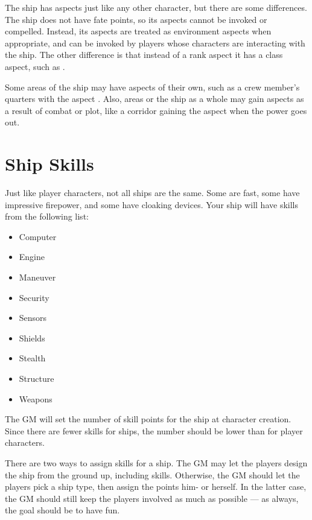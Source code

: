 \documentclass[12pt,titlepage,openany]{book}
\begin{document}
The ship has aspects just like any other character, but there are some
differences. The ship does not have fate points, so its aspects cannot be
invoked or compelled. Instead, its aspects are treated as environment aspects
when appropriate, and can be invoked by players whose characters are
interacting with the ship. The other difference is that instead of a rank
aspect it has a class aspect, such as .

Some areas of the ship may have aspects of their own, such as a crew member's
quarters with the aspect . Also, areas or the ship
as a whole may gain aspects as a result of combat or plot, like a corridor
gaining the aspect  when the power goes out.

\section{Ship Skills}\label{sec:ship-skills}

Just like player characters, not all ships are the same. Some are fast, some
have impressive firepower, and some have cloaking devices. Your ship will have
skills from the following list:

\begin{multicols}{3}
    \raggedcolumns
    \begin{itemize}
        \item Computer
        \item Engine
        \item Maneuver
        \item Security
        \item Sensors
        \item Shields
        \item Stealth
        \item Structure
        \item Weapons
    \end{itemize}
\end{multicols}

The GM will set the number of skill points for the ship at character creation.
Since there are fewer skills for ships, the number should be lower than for
player characters.

There are two ways to assign skills for a ship. The GM may let the players design
the ship from the ground up, including skills. Otherwise, the GM should let the
players pick a ship type, then assign the points him- or herself. In the latter
case, the GM should still keep the players involved as much as possible --- as
always, the goal should be to have fun.
\end{document}
